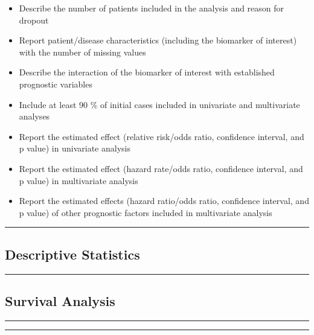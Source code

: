 \documentclass[
]{article}
\begin{document}
\begin{itemize}
\item
  Describe the number of patients included in the analysis and reason
  for dropout
\item
  Report patient/disease characteristics (including the biomarker of
  interest) with the number of missing values
\item
  Describe the interaction of the biomarker of interest with established
  prognostic variables
\item
  Include at least 90 \% of initial cases included in univariate and
  multivariate analyses
\item
  Report the estimated effect (relative risk/odds ratio, confidence
  interval, and p value) in univariate analysis
\item
  Report the estimated effect (hazard rate/odds ratio, confidence
  interval, and p value) in multivariate analysis
\item
  Report the estimated effects (hazard ratio/odds ratio, confidence
  interval, and p value) of other prognostic factors included in
  multivariate analysis
\end{itemize}

\begin{center}\rule{0.5\linewidth}{0.5pt}\end{center}

\hypertarget{descriptive-statistics}{%
\subsection{Descriptive Statistics}\label{descriptive-statistics}}

\begin{center}\rule{0.5\linewidth}{0.5pt}\end{center}

\newpage
\begin{landscape}

\end{landscape}

\hypertarget{survival-analysis}{%
\subsection{Survival Analysis}\label{survival-analysis}}

\begin{center}\rule{0.5\linewidth}{0.5pt}\end{center}

\begin{center}\rule{0.5\linewidth}{0.5pt}\end{center}
\end{document}
